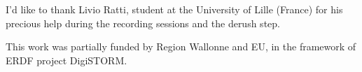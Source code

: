 \documentclass{article}
\begin{document}
\begin{acknowledgments}
I'd like to thank Livio Ratti, student at the University of Lille (France) for his precious help during the recording sessions and the derush step. 

This work was partially funded by Region Wallonne and EU, in the framework of ERDF project DigiSTORM.
\end{acknowledgments} 


\end{document}

